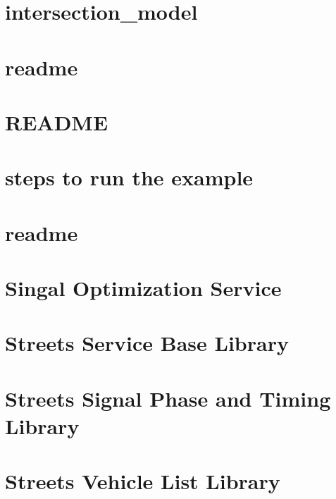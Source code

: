 \documentclass[twoside]{book}
\newcommand{\+}{\discretionary{\mbox{\scriptsize$\hookleftarrow$}}{}{}}
\begin{document}
\chapter{intersection\+\_\+model}
\label{md_intersection_model_readme}

\chapter{readme}
\label{md_kafka_clients_readme}

\chapter{README}
\label{md_README}

\chapter{steps to run the example}
\label{md_scheduling_service_readme}

\chapter{readme}
\label{md_scripts_readme}

\chapter{Singal Optimization Service}
\label{md_signal_opt_service_readme}

\chapter{Streets Service Base Library}
\label{md_streets_utils_streets_service_base_README}

\chapter{Streets Signal Phase and Timing Library}
\label{md_streets_utils_streets_signal_phase_and_timing_README}

\chapter{Streets Vehicle List Library}
\label{md_streets_utils_streets_vehicle_list_README}

\end{document}
